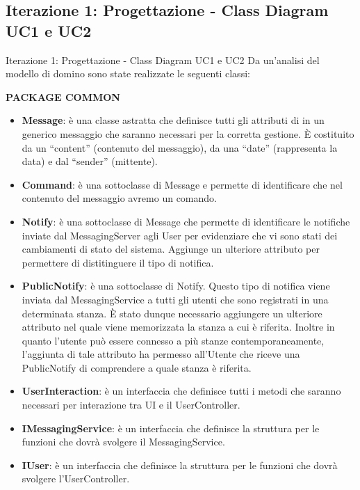 \subsection{Iterazione 1: Progettazione - Class Diagram UC1 e UC2}
 \begin{frame} [allowframebreaks] {Iterazione 1: Progettazione - Class Diagram UC1 e UC2}
   Da un'analisi del modello di domino sono state realizzate le seguenti classi:  
  \newline
  \centerline{\textbf{PACKAGE COMMON}}
  \begin{itemize}
   \item \textbf{Message}: è una classe astratta che definisce tutti gli attributi di in un generico messaggio che saranno necessari per la corretta gestione.
                 È costituito da un ``content'' (contenuto del messaggio), da una ``date'' (rappresenta la data) e dal ``sender'' (mittente).
   \item \textbf{Command}: è una sottoclasse di Message e permette di identificare che nel contenuto del messaggio avremo un comando.
   \item \textbf{Notify}: è una sottoclasse di Message che permette di identificare le notifiche inviate dal MessagingServer agli User per evidenziare che vi sono 
          stati dei cambiamenti di stato del sistema. Aggiunge un ulteriore attributo per permettere di distitinguere il tipo di notifica.
   \item \textbf{PublicNotify}: è una sottoclasse di Notify. Questo tipo di notifica viene inviata dal MessagingService a tutti gli utenti che sono registrati in una 
         determinata stanza. È stato dunque necessario aggiungere un ulteriore attributo nel quale viene memorizzata la stanza a cui è riferita. Inoltre in quanto 
         l'utente può essere connesso a più stanze contemporaneamente, l'aggiunta di tale attributo ha permesso all'Utente che riceve una PublicNotify di comprendere 
         a quale stanza è riferita.
   \item \textbf{UserInteraction}: è un interfaccia che definisce tutti i metodi che saranno necessari per interazione tra UI e il UserController.
   \item \textbf{IMessagingService}: è un interfaccia che definisce la struttura per le funzioni che dovrà svolgere il MessagingService.
   \item \textbf{IUser}: è un interfaccia che definisce la struttura per le funzioni che dovrà svolgere l'UserController.
  \end{itemize} 
 \end{frame}
